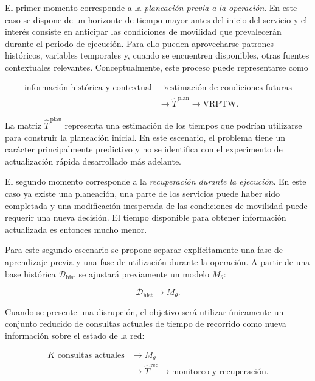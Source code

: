 \documentclass[11pt]{article}
\begin{document}
El primer momento corresponde a la \textit{planeación previa a la operación}.
En este caso se dispone de un horizonte de tiempo mayor antes del inicio del
servicio y el interés consiste en anticipar las condiciones de movilidad que
prevalecerán durante el periodo de ejecución. Para ello pueden aprovecharse
patrones históricos, variables temporales y, cuando se encuentren disponibles,
otras fuentes contextuales relevantes. Conceptualmente, este proceso puede
representarse como

\[
\begin{aligned}
\text{información histórica y contextual}
&\longrightarrow
\text{estimación de condiciones futuras} \\
&\longrightarrow
\widehat{T}^{\,\mathrm{plan}}
\longrightarrow
\text{VRPTW}.
\end{aligned}
\]

La matriz \(\widehat{T}^{\,\mathrm{plan}}\) representa una estimación de los
tiempos que podrían utilizarse para construir la planeación inicial. En este
escenario, el problema tiene un carácter principalmente predictivo y no se
identifica con el experimento de actualización rápida desarrollado más
adelante.

El segundo momento corresponde a la \textit{recuperación durante la
ejecución}. En este caso ya existe una planeación, una parte de los servicios
puede haber sido completada y una modificación inesperada de las condiciones
de movilidad puede requerir una nueva decisión. El tiempo disponible para
obtener información actualizada es entonces mucho menor.

Para este segundo escenario se propone separar explícitamente una fase de
aprendizaje previa y una fase de utilización durante la operación. A partir de
una base histórica \(\mathcal{D}_{\mathrm{hist}}\) se ajustará previamente un
modelo \(M_{\theta}\):

\[
\mathcal{D}_{\mathrm{hist}}
\longrightarrow
M_{\theta}.
\]

Cuando se presente una disrupción, el objetivo será utilizar únicamente un
conjunto reducido de consultas actuales de tiempo de recorrido como nueva
información sobre el estado de la red:

\[
\begin{aligned}
K\text{ consultas actuales}
&\longrightarrow
M_{\theta} \\
&\longrightarrow
\widehat{T}^{\,\mathrm{rec}}
\longrightarrow
\text{monitoreo y recuperación}.
\end{aligned}
\]
\end{document}
